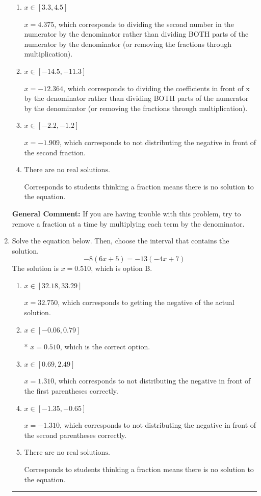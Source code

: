 \documentclass{extbook}[14pt]
\newcommand{\litem}[1]{\item #1

\rule{\textwidth}{0.4pt}}
\begin{document}
\begin{enumerate}
{\begin{enumerate}[label=\Alph*.]
* $x = -3.182$, which is the correct option.
\item \( x \in [3.3, 4.5] \)

 $x = 4.375$, which corresponds to dividing the second number in the numerator by the denominator rather than dividing BOTH parts of the numerator by the denominator (or removing the fractions through multiplication).
\item \( x \in [-14.5, -11.3] \)

 $x = -12.364$, which corresponds to dividing the coefficients in front of x by the denominator rather than dividing BOTH parts of the numerator by the denominator (or removing the fractions through multiplication).
\item \( x \in [-2.2, -1.2] \)

 $x = -1.909$, which corresponds to not distributing the negative in front of the second fraction.
\item \( \text{There are no real solutions.} \)

Corresponds to students thinking a fraction means there is no solution to the equation.
\end{enumerate}

\textbf{General Comment:} If you are having trouble with this problem, try to remove a fraction at a time by multiplying each term by the denominator.
}
\litem{
Solve the equation below. Then, choose the interval that contains the solution.
\[ -8(6x + 5) = -13(-4x + 7) \]The solution is \( x = 0.510 \), which is option B.\begin{enumerate}[label=\Alph*.]
\item \( x \in [32.18, 33.29] \)

$x = 32.750$, which corresponds to getting the negative of the actual solution.
\item \( x \in [-0.06, 0.79] \)

* $x = 0.510$, which is the correct option.
\item \( x \in [0.69, 2.49] \)

$x = 1.310$, which corresponds to not distributing the negative in front of the first parentheses correctly.
\item \( x \in [-1.35, -0.65] \)

$x = -1.310$, which corresponds to not distributing the negative in front of the second parentheses correctly.
\item \( \text{There are no real solutions.} \)

Corresponds to students thinking a fraction means there is no solution to the equation.
\end{enumerate}

}
\end{enumerate}
\end{document}
